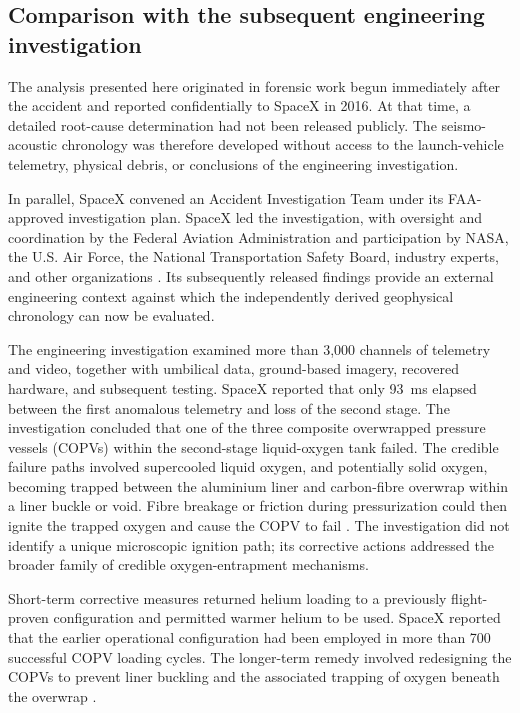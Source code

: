 \documentclass[]{seismica}
\begin{document}
\subsection{Comparison with the subsequent engineering investigation}
\label{sec:discussion_investigation}

The analysis presented here originated in forensic work begun immediately after
the accident and reported confidentially to SpaceX in 2016. At that time, a
detailed root-cause determination had not been released publicly. The
seismo-acoustic chronology was therefore developed without access to the
launch-vehicle telemetry, physical debris, or conclusions of the engineering
investigation.

In parallel, SpaceX convened an Accident Investigation Team under its
FAA-approved investigation plan. SpaceX led the investigation, with oversight
and coordination by the Federal Aviation Administration and participation by
NASA, the U.S. Air Force, the National Transportation Safety Board, industry
experts, and other organizations
\citep{spacex_anomaly_2017,nasa_sma_falcon9}. Its subsequently released
findings provide an external engineering context against which the independently
derived geophysical chronology can now be evaluated.

The engineering investigation examined more than 3,000 channels of telemetry
and video, together with umbilical data, ground-based imagery, recovered
hardware, and subsequent testing. SpaceX reported that only 93~ms elapsed
between the first anomalous telemetry and loss of the second stage. The
investigation concluded that one of the three composite overwrapped pressure
vessels (COPVs) within the second-stage liquid-oxygen tank failed. The credible
failure paths involved supercooled liquid oxygen, and potentially solid oxygen,
becoming trapped between the aluminium liner and carbon-fibre overwrap within
a liner buckle or void. Fibre breakage or friction during pressurization could
then ignite the trapped oxygen and cause the COPV to fail
\citep{spacex_anomaly_2017,nasa_sma_falcon9}. The investigation did not
identify a unique microscopic ignition path; its corrective actions addressed
the broader family of credible oxygen-entrapment mechanisms.

Short-term corrective measures returned helium loading to a previously
flight-proven configuration and permitted warmer helium to be used. SpaceX
reported that the earlier operational configuration had been employed in more
than 700 successful COPV loading cycles. The longer-term remedy involved
redesigning the COPVs to prevent liner buckling and the associated trapping of
oxygen beneath the overwrap \citep{spacex_anomaly_2017}.
\end{document}
